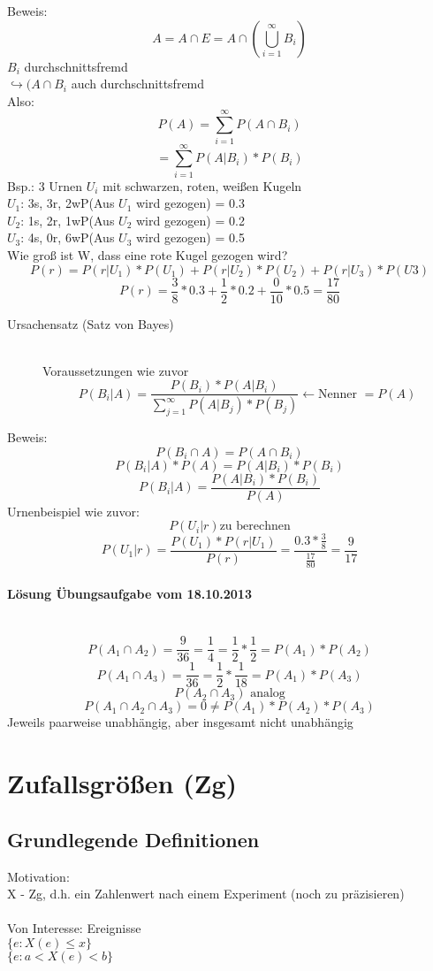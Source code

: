 \documentclass[a4paper,12pt]{scrartcl}
\begin{document}
Beweis:
$$A = A\cap E = A\cap (\bigcup^\infty_{i=1}B_i)$$
$B_i$ durchschnittsfremd\\
$\hookrightarrow (A\cap B_i$ auch durchschnittsfremd\\
Also:
$$P(A) = \sum^\infty_{i=1}P(A\cap B_i)$$
$$= \sum^\infty_{i=1}P(A|B_i)*P(B_i)$$
Bsp.: 3 Urnen $U_i$ mit schwarzen, roten, weißen Kugeln\\
$U_1$: 3s, 3r, 2w\quad P(Aus $U_1$ wird gezogen) = 0.3\\
$U_2$: 1s, 2r, 1w\quad P(Aus $U_2$ wird gezogen) = 0.2\\
$U_3$: 4s, 0r, 6w\quad P(Aus $U_3$ wird gezogen) = 0.5\\
Wie groß ist W, dass eine rote Kugel gezogen wird?\\
$$P(r) = P(r|U_1)*P(U_1) + P(r|U_2)*P(U_2)+P(r|U_3)*P(U3)$$
$$P(r) = \frac{3}{8}*0.3 + \frac{1}{2}*0.2 + \frac{0}{10}*0.5 = \frac{17}{80}$$

\begin{description}
 \item[Ursachensatz (Satz von Bayes)]\quad\\ 
 Voraussetzungen wie zuvor
 $$P(B_i|A) = \frac{P(B_i) * P(A|B_i)}{\sum^\infty_{j=1}P(A|B_j)*P(B_j)}\leftarrow \text{Nenner }=P(A)$$
\end{description}
Beweis:
$$P(B_i\cap A) = P(A\cap B_i) $$
$$P(B_i|A)*P(A) = P(A|B_i)*P(B_i)$$
$$P(B_i|A) = \frac{P(A|B_i)*P(B_i)}{P(A)}$$
Urnenbeispiel wie zuvor:
$$P(U_i|r)\text{zu berechnen}$$
$$P(U_1|r) = \frac{P(U_1)*P(r|U_1)}{P(r)} = \frac{0.3*\frac{3}{8}}{\frac{17}{80}}= \frac{9}{17}$$

\paragraph{Lösung Übungsaufgabe vom 18.10.2013} \quad\\
$$P(A_1\cap A_2) = \frac{9}{36}=\frac{1}{4}=\frac{1}{2}*\frac{1}{2}=P(A_1)*P(A_2)$$
$$P(A_1\cap A_3) = \frac{1}{36}=\frac{1}{2}*\frac{1}{18}=P(A_1)*P(A_3) $$
$$P(A_2\cap A_3)\text{ analog}$$
$$P(A_1\cap A_2 \cap A_3) = 0 \neq P(A_1)*P(A_2)*P(A_3)$$
Jeweils paarweise unabhängig, aber insgesamt nicht unabhängig

\section{Zufallsgrößen (Zg)}
\subsection{Grundlegende Definitionen}
Motivation:\\
X - Zg, d.h. ein Zahlenwert nach einem Experiment (noch zu präzisieren)\\
\\
Von Interesse: Ereignisse \\
$\{e: X(e)\leq x\} $\\
$\{e: a<X(e)< b\} $\\
\\
\end{document}
